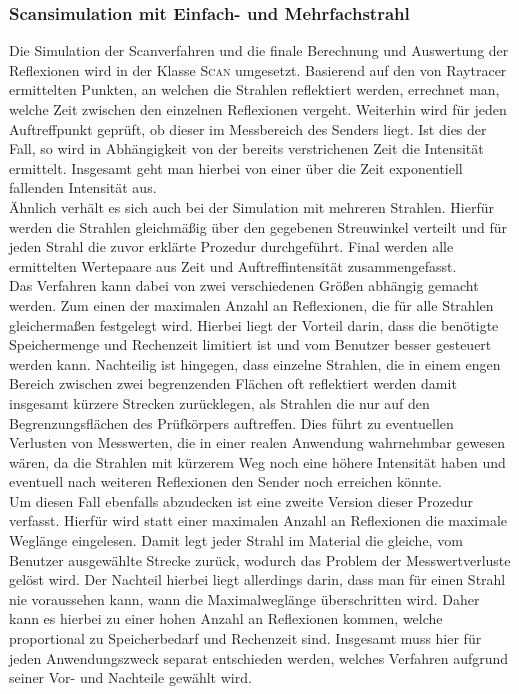 \documentclass[reducespace,stylepage,semiarbeit]{spezidoc}
\begin{document}
\subsubsection{Scansimulation mit Einfach- und Mehrfachstrahl} %
Die Simulation der Scanverfahren und die finale Berechnung und Auswertung der Reflexionen wird in der Klasse \textsc{Scan} umgesetzt. %
Basierend auf den von Raytracer ermittelten Punkten, an welchen die Strahlen reflektiert werden, errechnet man, welche Zeit zwischen den einzelnen Reflexionen vergeht.
Weiterhin wird für jeden Auftreffpunkt geprüft, ob dieser im Messbereich des Senders liegt. 
Ist dies der Fall, so wird in Abhängigkeit von der bereits verstrichenen Zeit die Intensität ermittelt. 
Insgesamt geht man hierbei von einer über die Zeit exponentiell fallenden Intensität aus.\\
Ähnlich verhält es sich auch bei der Simulation mit mehreren Strahlen. 
Hierfür werden die Strahlen gleichmäßig über den gegebenen Streuwinkel verteilt und für jeden Strahl die zuvor erklärte Prozedur durchgeführt. 
Final werden alle ermittelten Wertepaare aus Zeit und Auftreffintensität zusammengefasst.\\
Das Verfahren kann dabei von zwei verschiedenen Größen abhängig gemacht werden. 
Zum einen der maximalen Anzahl an Reflexionen, die für alle Strahlen gleichermaßen festgelegt wird. Hierbei liegt der Vorteil darin, dass die benötigte Speichermenge und Rechenzeit limitiert ist und vom Benutzer besser gesteuert werden kann. 
Nachteilig ist hingegen, dass einzelne Strahlen, die in einem engen Bereich zwischen zwei begrenzenden Flächen oft reflektiert werden damit insgesamt kürzere Strecken zurücklegen, als Strahlen die nur auf den Begrenzungsflächen des Prüfkörpers auftreffen. 
Dies führt zu eventuellen Verlusten von Messwerten, die in einer realen Anwendung wahrnehmbar gewesen wären, da die Strahlen mit kürzerem Weg noch eine höhere Intensität haben und eventuell nach weiteren Reflexionen den Sender noch erreichen könnte.\\
Um diesen Fall ebenfalls abzudecken ist eine zweite Version dieser Prozedur verfasst. 
Hierfür wird statt einer maximalen Anzahl an Reflexionen die maximale Weglänge eingelesen. 
Damit legt jeder Strahl im Material die gleiche, vom Benutzer ausgewählte Strecke zurück, wodurch das Problem der Messwertverluste gelöst wird. 
Der Nachteil hierbei liegt allerdings darin, dass man für einen Strahl nie voraussehen kann, wann die Maximalweglänge überschritten wird. 
Daher kann es hierbei zu einer hohen Anzahl an Reflexionen kommen, welche proportional zu Speicherbedarf und Rechenzeit sind. 
Insgesamt muss hier für jeden Anwendungszweck separat entschieden werden, welches Verfahren aufgrund seiner Vor- und Nachteile gewählt wird.\\
\end{document}

